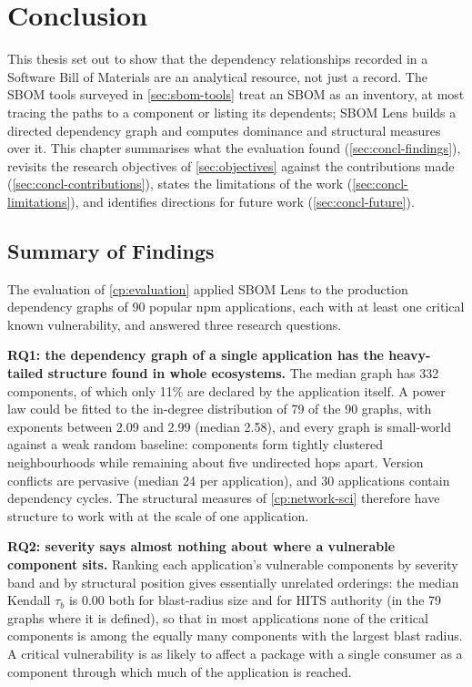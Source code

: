 \chapter[Conclusion]{Conclusion}
\label{cp:conclusion}

This thesis set out to show that the dependency relationships recorded in a Software Bill of Materials are an analytical resource, not just a record. The SBOM tools surveyed in \autoref{sec:sbom-tools} treat an SBOM as an inventory, at most tracing the paths to a component or listing its dependents; SBOM Lens builds a directed dependency graph and computes dominance and structural measures over it. This chapter summarises what the evaluation found (\autoref{sec:concl-findings}), revisits the research objectives of \autoref{sec:objectives} against the contributions made (\autoref{sec:concl-contributions}), states the limitations of the work (\autoref{sec:concl-limitations}), and identifies directions for future work (\autoref{sec:concl-future}).


\section{Summary of Findings}
\label{sec:concl-findings}

The evaluation of \autoref{cp:evaluation} applied SBOM Lens to the production dependency graphs of 90 popular npm applications, each with at least one critical known vulnerability, and answered three research questions.

\textbf{RQ1: the dependency graph of a single application has the heavy-tailed structure found in whole ecosystems.} The median graph has 332 components, of which only 11\% are declared by the application itself. A power law could be fitted to the in-degree distribution of 79 of the 90 graphs, with exponents between 2.09 and 2.99 (median 2.58), and every graph is small-world against a weak random baseline: components form tightly clustered neighbourhoods while remaining about five undirected hops apart. Version conflicts are pervasive (median 24 per application), and 30 applications contain dependency cycles. The structural measures of \autoref{cp:network-sci} therefore have structure to work with at the scale of one application.

\textbf{RQ2: severity says almost nothing about where a vulnerable component sits.} Ranking each application's vulnerable components by severity band and by structural position gives essentially unrelated orderings: the median Kendall \(\tau_b\) is 0.00 both for blast-radius size and for HITS authority (in the 79 graphs where it is defined), so that in most applications none of the critical components is among the equally many components with the largest blast radius. A critical vulnerability is as likely to affect a package with a single consumer as a component through which much of the application is reached.

